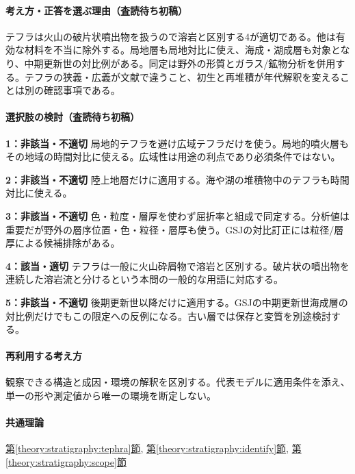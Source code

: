 \paragraph{考え方・正答を選ぶ理由（査読待ち初稿）} テフラは火山の破片状噴出物を扱うので溶岩と区別する4が適切である。他は有効な材料を不当に除外する。局地層も局地対比に使え、海成・湖成層も対象となり、中期更新世の対比例がある。同定は野外の形質とガラス/鉱物分析を併用する。テフラの狭義・広義が文献で違うこと、初生と再堆積が年代解釈を変えることは別の確認事項である。

\paragraph{選択肢の検討（査読待ち初稿）}\mbox{}\par

\noindent\textbf{1：非該当・不適切} 局地的テフラを避け広域テフラだけを使う。局地的噴火層もその地域の時間対比に使える。広域性は用途の利点であり必須条件ではない。\par

\noindent\textbf{2：非該当・不適切} 陸上地層だけに適用する。海や湖の堆積物中のテフラも時間対比に使える。\par

\noindent\textbf{3：非該当・不適切} 色・粒度・層厚を使わず屈折率と組成で同定する。分析値は重要だが野外の層序位置・色・粒径・層厚も使う。GSJの対比訂正には粒径/層厚による候補排除がある。\par

\noindent\textbf{4：該当・適切} テフラは一般に火山砕屑物で溶岩と区別する。破片状の噴出物を連続した溶岩流と分けるという本問の一般的な用語に対応する。\par

\noindent\textbf{5：非該当・不適切} 後期更新世以降だけに適用する。GSJの中期更新世海成層の対比例だけでもこの限定への反例になる。古い層では保存と変質を別途検討する。\par

\paragraph{再利用する考え方} 観察できる構造と成因・環境の解釈を区別する。代表モデルに適用条件を添え、単一の形や測定値から唯一の環境を断定しない。

\paragraph{共通理論} \hyperref[theory:stratigraphy:tephra]{第\ref*{theory:stratigraphy:tephra}節}, \hyperref[theory:stratigraphy:identify]{第\ref*{theory:stratigraphy:identify}節}, \hyperref[theory:stratigraphy:scope]{第\ref*{theory:stratigraphy:scope}節}

